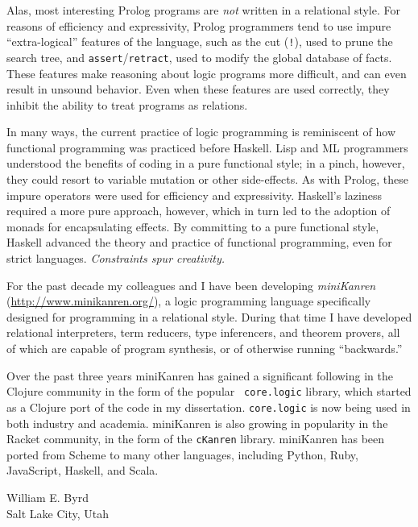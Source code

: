 Alas, most interesting Prolog programs are \emph{not} written in a
relational style.  For reasons of efficiency and expressivity, Prolog
programmers tend to use impure ``extra-logical'' features of the
language, such as the cut ({\tt !}), used to prune the search tree,
and {\tt assert}/{\tt retract}, used to modify the global database of
facts.  These features make reasoning about logic programs more
difficult, and can even result in unsound behavior.  Even when these
features are used correctly, they inhibit the ability to treat programs
as relations.%

In many ways, the current practice of logic programming is reminiscent
of how functional programming was practiced before Haskell.  Lisp and
ML programmers understood the benefits of coding in a pure functional
style; in a pinch, however, they could resort to variable mutation or
other side-effects.  As with Prolog, these impure operators were used
for efficiency and expressivity.  Haskell's laziness required a more
pure approach, however, which in turn led to the adoption of monads
for encapsulating effects.  By committing to a pure functional style,
Haskell advanced the theory and practice of functional programming,
even for strict languages.
%
\emph{Constraints spur creativity.}

For the past decade my colleagues and I have been developing
\emph{miniKanren} (\url{http://www.minikanren.org/}), a logic programming
language specifically designed for programming in a relational style.
%
During that time I have developed relational interpreters, term
reducers, type inferencers, and theorem provers, all of which are
capable of program synthesis, or of otherwise running ``backwards.''

Over the past three years miniKanren has gained a significant
following in the Clojure community in the form of the popular {\tt
  core.logic} library, which started as a Clojure port of the code in
my dissertation.  {\tt core.logic} is now being used in both industry
and academia.  miniKanren is also growing in popularity in the Racket
community, in the form of the {\tt cKanren} library. miniKanren has
been ported from Scheme to many other languages, including Python,
Ruby, JavaScript, Haskell, and Scala.

\wspace

\noindent
William E. Byrd\\
\noindent
Salt Lake City, Utah\\
\noindent
\monthyear
